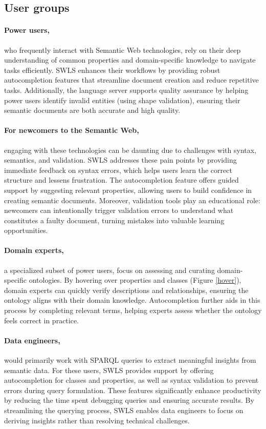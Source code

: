 \subsection{User groups}

\paragraph{Power users,} who frequently interact with Semantic Web technologies, rely on their deep understanding of common properties and domain-specific knowledge to navigate tasks efficiently.
SWLS enhances their workflows by providing robust autocompletion features that streamline document creation and reduce repetitive tasks.
Additionally, the language server supports quality assurance by helping power users identify invalid entities (using shape validation), ensuring their semantic documents are both accurate and high quality.

\paragraph{For newcomers to the Semantic Web,} engaging with these technologies can be daunting due to challenges with syntax, semantics, and validation. 
SWLS addresses these pain points by providing immediate feedback on syntax errors, which helps users learn the correct structure and lessens frustration.
The autocompletion feature offers guided support by suggesting relevant properties, allowing users to build confidence in creating semantic documents.
Moreover, validation tools play an educational role: newcomers can intentionally trigger validation errors to understand what constitutes a faulty document, turning mistakes into valuable learning opportunities.

\paragraph{Domain experts,} a specialized subset of power users, focus on assessing and curating domain-specific ontologies.
By hovering over properties and classes (Figure \ref{hover}), domain experts can quickly verify descriptions and relationships, ensuring the ontology aligns with their domain knowledge.
Autocompletion further aids in this process by completing relevant terms, helping experts assess whether the ontology feels correct in practice.

\paragraph{Data engineers,} would primarily work with SPARQL queries to extract meaningful insights from semantic data. 
For these users, SWLS provides support by offering autocompletion for classes and properties, as well as syntax validation to prevent errors during query formulation. 
These features significantly enhance productivity by reducing the time spent debugging queries and ensuring accurate results. 
By streamlining the querying process, SWLS enables data engineers to focus on deriving insights rather than resolving technical challenges.


